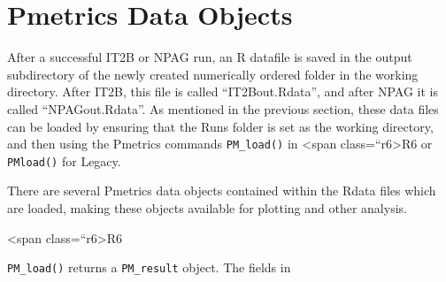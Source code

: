 \documentclass[
]{book}
\newenvironment{Shaded}{\begin{snugshade}}{\end{snugshade}}
\newcommand{\DecValTok}[1]{\textcolor[rgb]{0.00,0.00,0.81}{#1}}
\newcommand{\ErrorTok}[1]{\textcolor[rgb]{0.64,0.00,0.00}{\textbf{#1}}}
\newcommand{\FunctionTok}[1]{\textcolor[rgb]{0.00,0.00,0.00}{#1}}
\newcommand{\NormalTok}[1]{#1}
\newcommand{\OtherTok}[1]{\textcolor[rgb]{0.56,0.35,0.01}{#1}}
\newcommand{\SpecialCharTok}[1]{\textcolor[rgb]{0.00,0.00,0.00}{#1}}
\begin{document}
\hypertarget{pmetrics-data-objects}{%
\chapter{Pmetrics Data Objects}\label{pmetrics-data-objects}}

After a successful IT2B or NPAG run, an R datafile is saved in the
output subdirectory of the newly created numerically ordered folder in
the working directory. After IT2B, this file is called ``IT2Bout.Rdata'',
and after NPAG it is called ``NPAGout.Rdata''. As mentioned in the
previous section, these data files can be loaded by ensuring that the
Runs folder is set as the working directory, and then using the Pmetrics
commands \texttt{PM\_load()} in \textless span class=``r6\textgreater R6 or \texttt{PMload()} for
{Legacy}.

There are several Pmetrics data objects contained within the Rdata files
which are loaded, making these objects available for
plotting and other analysis.

\textless span class=``r6\textgreater R6

\texttt{PM\_load()} returns a \texttt{PM\_result} object. The fields in

\begin{Shaded}
\end{Shaded}
\end{document}
